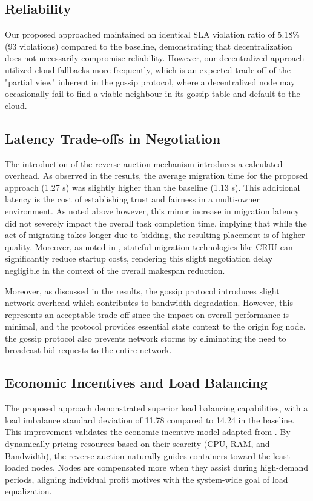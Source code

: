 \documentclass{article}
\begin{document}
\subsection{Reliability}
Our proposed approached maintained an identical SLA violation ratio of 5.18\% (93 violations) compared to the baseline, demonstrating that decentralization does not necessarily compromise reliability. However, our decentralized approach utilized cloud fallbacks more frequently, which is an expected trade-off of the "partial view" inherent in the gossip protocol, where a decentralized node may occasionally fail to find a viable neighbour in its gossip table and default to the cloud. 

\subsection{Latency Trade-offs in Negotiation}
The introduction of the reverse-auction mechanism introduces a calculated overhead. As observed in the results, the average migration time for the proposed approach (1.27 s) was slightly higher than the baseline (1.13 s). This additional latency is the cost of establishing trust and fairness in a multi-owner environment. As noted above however, this minor increase in migration latency did not severely impact the overall task completion time, implying that while the act of migrating takes longer due to bidding, the resulting placement is of higher quality. Moreover, as noted in \cite{tranProactiveStatefulFaultTolerant2022}, stateful migration technologies like CRIU can significantly reduce startup costs, rendering this slight negotiation delay negligible in the context of the overall makespan reduction.

Moreover, as discussed in the results, the gossip protocol introduces slight network overhead which contributes to bandwidth degradation. However, this represents an acceptable trade-off since the impact on overall performance is minimal, and the protocol provides essential state context to the origin fog node. the gossip protocol also prevents network storms by eliminating the need to broadcast bid requests to the entire network.

\subsection{Economic Incentives and Load Balancing}

The proposed approach demonstrated superior load balancing capabilities, with a load imbalance standard deviation of 11.78 compared to 14.24 in the baseline. This improvement validates the economic incentive model adapted from \cite{heOnlineAuctionbasedIncentive2022}. By dynamically pricing resources based on their scarcity (CPU, RAM, and Bandwidth), the reverse auction naturally guides containers toward the least loaded nodes. Nodes are compensated more when they assist during high-demand periods, aligning individual profit motives with the system-wide goal of load equalization.
\end{document}
